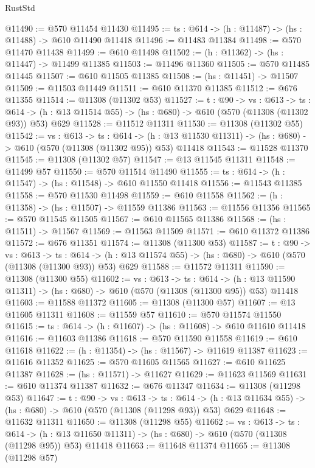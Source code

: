 \begin{lexlean}{RustStd}
\begin{coremodule}
@11490 := @570 @11454 @11430
@11495 := {ts : @614} -> (h : @11487) -> (hs : @11488) -> @610 @11490 @11418
@11496 := @11483 @11384
@11498 := @570 @11470 @11438
@11499 := @610 @11498
@11502 := (h : @11362) -> (hs : @11447) -> @11499 @11385
@11503 := @11496 @11360
@11505 := @570 @11485 @11445
@11507 := @610 @11505 @11385
@11508 := (hs : @11451) -> @11507
@11509 := @11503 @11449
@11511 := @610 @11370 @11385
@11512 := @676 @11355
@11514 := @11308 (@11302 @53)
@11527 := {t : @90} ->
  {vs : @613} ->
  {ts : @614} -> (h : @13 @11514 @55) -> (hs : @680) -> @610 (@570 (@11308 (@11302 @93)) @53) @629
@11528 := @11512 @11311
@11530 := @11308 (@11302 @55)
@11542 := {vs : @613} ->
  {ts : @614} ->
  (h : @13 @11530 @11311) -> (hs : @680) -> @610 (@570 (@11308 (@11302 @95)) @53) @11418
@11543 := @11528 @11370
@11545 := @11308 (@11302 @57)
@11547 := @13 @11545 @11311
@11548 := @11499 @57
@11550 := @570 @11514 @11490
@11555 := {ts : @614} -> (h : @11547) -> (hs : @11548) -> @610 @11550 @11418
@11556 := @11543 @11385
@11558 := @570 @11530 @11498
@11559 := @610 @11558
@11562 := (h : @11358) -> (hs : @11507) -> @11559 @11386
@11563 := @11556 @11356
@11565 := @570 @11545 @11505
@11567 := @610 @11565 @11386
@11568 := (hs : @11511) -> @11567
@11569 := @11563 @11509
@11571 := @610 @11372 @11386
@11572 := @676 @11351
@11574 := @11308 (@11300 @53)
@11587 := {t : @90} ->
  {vs : @613} ->
  {ts : @614} -> (h : @13 @11574 @55) -> (hs : @680) -> @610 (@570 (@11308 (@11300 @93)) @53) @629
@11588 := @11572 @11311
@11590 := @11308 (@11300 @55)
@11602 := {vs : @613} ->
  {ts : @614} ->
  (h : @13 @11590 @11311) -> (hs : @680) -> @610 (@570 (@11308 (@11300 @95)) @53) @11418
@11603 := @11588 @11372
@11605 := @11308 (@11300 @57)
@11607 := @13 @11605 @11311
@11608 := @11559 @57
@11610 := @570 @11574 @11550
@11615 := {ts : @614} -> (h : @11607) -> (hs : @11608) -> @610 @11610 @11418
@11616 := @11603 @11386
@11618 := @570 @11590 @11558
@11619 := @610 @11618
@11622 := (h : @11354) -> (hs : @11567) -> @11619 @11387
@11623 := @11616 @11352
@11625 := @570 @11605 @11565
@11627 := @610 @11625 @11387
@11628 := (hs : @11571) -> @11627
@11629 := @11623 @11569
@11631 := @610 @11374 @11387
@11632 := @676 @11347
@11634 := @11308 (@11298 @53)
@11647 := {t : @90} ->
  {vs : @613} ->
  {ts : @614} -> (h : @13 @11634 @55) -> (hs : @680) -> @610 (@570 (@11308 (@11298 @93)) @53) @629
@11648 := @11632 @11311
@11650 := @11308 (@11298 @55)
@11662 := {vs : @613} ->
  {ts : @614} ->
  (h : @13 @11650 @11311) -> (hs : @680) -> @610 (@570 (@11308 (@11298 @95)) @53) @11418
@11663 := @11648 @11374
@11665 := @11308 (@11298 @57)

\end{coremodule}
\end{lexlean}
